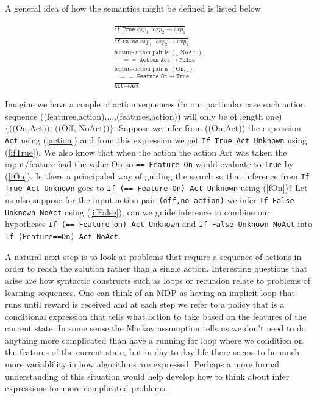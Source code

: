 \documentclass[a4paper,12pt]{article}
\begin{document}
A general idea of how the semantics might be defined is listed below

\begin{eqnarray}
&\frac{}{\texttt{if True } exp_1\texttt{ } exp_2 \rightarrow exp_1}\label{ifTrue}&\\
&\frac{}{\texttt{if False } exp_1\texttt{ } exp_2 \rightarrow exp_2} \label{ifFalse}&\\
&\frac{\text{feature-action pair is } (\_,\text{NoAct})}{== \texttt{ Action } \texttt{Act} \rightarrow \texttt{False}} &\\
&\frac{\text{feature-action pair is } (\text{On},\_)}{== \texttt{ Feature } \texttt{On} \rightarrow \texttt{True}} \label{fOn} &\\
&\frac{}{\texttt{Act} \rightarrow \text{Act}} \label{action}&
\end{eqnarray}

Imagine we have a couple of action sequences (in our particular case each action sequence ((features,action),...,(features,action))  will only be of length one) $\{\text{((On,Act)), ((Off, NoAct))}\}$.  Suppose we infer from ((On,Act)) the expression \texttt{Act} using (\ref{action}) and from this expression we get \texttt{If True Act Unknown} using (\ref{ifTrue}).  We also know that when the action the action Act was taken the input/feature had the value On so \texttt{== Feature On} would evaluate to \texttt{True} by (\ref{fOn}).  Is there a principaled way of guiding the search so that inference from \texttt{If True Act Unknown} goes to \texttt{If (== Feature On) Act Unknown} using (\ref{fOn})?  Let us also suppose for the input-action pair \texttt{(off,no action)} we infer \texttt{If False Unknown NoAct} using (\ref{ifFalse}), can we guide inference to combine our hypotheses \texttt{If (== Feature on) Act Unknown} and \texttt{If False Unknown NoAct} into \texttt{If (Feature==On) Act NoAct}.

A natural next step is to look at problems that require a sequence of actions in order to reach the solution rather than a single action.  Interesting questions that arise are how syntactic constructs such as loops or recursion relate to problems of learning sequences.  One can think of an MDP as having an implicit loop that runs until reward is received and at each step we refer to a policy that is a conditional expression that tells what action to take based on the features of the current state.  In some sense the Markov assumption tells us we don't need to do anything more complicated than have a running for loop where we condition on the features of the current state, but in day-to-day life there seems to be much more variablility in how algorithms are expressed.  Perhaps a more formal understanding of this situation would help develop how to think about infer expressions for more complicated problems.


\end{document}
